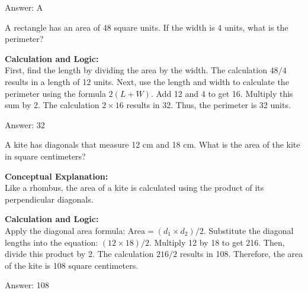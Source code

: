 \documentclass[11pt,paper=a4,answers]{exam}
\begin{document}
\begin{questions}
\begin{solution}
\vspace{30pt}

Answer: \colorbox{yellow!100}{A}
\end{solution}

\vspace{60pt}

\question
A rectangle has an area of 48 square units. If the width is 4 units, what is the perimeter?

\begin{solution}
\textbf{Calculation and Logic:} \\
First, find the length by dividing the area by the width. The calculation $48 / 4$ results in a length of 12 units. Next, use the length and width to calculate the perimeter using the formula $2(L + W)$. Add 12 and 4 to get 16. Multiply this sum by 2. The calculation $2 \times 16$ results in 32. Thus, the perimeter is 32 units.

\vspace{30pt}

Answer: \colorbox{yellow!100}{32}
\end{solution}

\vspace{60pt}

\question
A kite has diagonals that measure 12 cm and 18 cm. What is the area of the kite in square centimeters?

\begin{solution}
\textbf{Conceptual Explanation:} \\
Like a rhombus, the area of a kite is calculated using the product of its perpendicular diagonals.

\vspace{30pt}

\textbf{Calculation and Logic:} \\
Apply the diagonal area formula: $\text{Area} = (d_1 \times d_2) / 2$. Substitute the diagonal lengths into the equation: $(12 \times 18) / 2$. Multiply 12 by 18 to get 216. Then, divide this product by 2. The calculation $216 / 2$ results in 108. Therefore, the area of the kite is 108 square centimeters.

\vspace{30pt}

Answer: \colorbox{yellow!100}{108}
\end{solution}


\end{questions}
\end{document}
